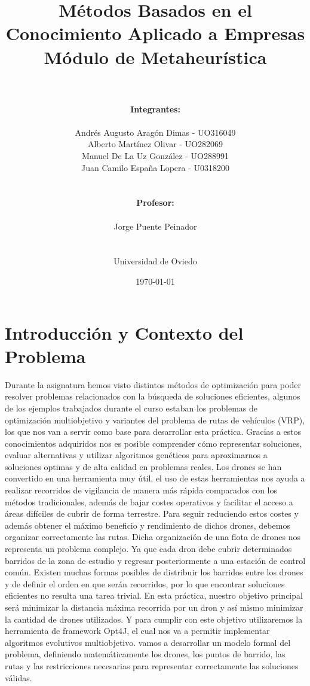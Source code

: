 \documentclass[11pt,a4paper]{article}
\title{Métodos Basados en el Conocimiento Aplicado a Empresas\\
       Módulo de Metaheurística}
\author{\\\\
\textbf{Integrantes:}\\\\
Andrés Augusto Aragón Dimas - UO316049 \\
Alberto Martínez Olivar - UO282069\\ 
Manuel De La Uz González - UO288991\\ 
Juan Camilo España Lopera - U0318200\\\\\\
\textbf{Profesor:}\\\\
Jorge Puente Peinador\\\\\\
Universidad de Oviedo\\
}
\date{\today}
\begin{document}
\maketitle

\newpage
\tableofcontents

\newpage
\section{Introducción y Contexto del Problema}


Durante la asignatura hemos visto distintos métodos de optimización para poder resolver problemas relacionados con la búsqueda de soluciones eficientes, algunos de los ejemplos trabajados durante el curso estaban los problemas de optimización multiobjetivo y variantes del problema de rutas de vehículos (VRP), los que nos van a servir como base para desarrollar esta práctica. Gracias a estos conocimientos adquiridos nos es posible comprender cómo representar soluciones, evaluar alternativas y utilizar algoritmos genéticos para aproximarnos a soluciones optimas y de alta calidad en problemas reales.
Los drones se han convertido en una herramienta muy útil, el uso de estas herramientas nos ayuda a realizar recorridos de vigilancia de manera más rápida comparados con los métodos tradicionales, además de bajar costes operativos y facilitar el acceso a áreas difíciles de cubrir de forma terrestre. Para seguir reduciendo estos costes y además obtener el máximo beneficio y rendimiento de dichos drones, debemos organizar correctamente las rutas.
Dicha organización de una flota de drones nos representa un problema complejo. Ya que cada dron debe cubrir determinados barridos de la zona de estudio y regresar posteriormente a una estación de control común. Existen muchas formas posibles de distribuir los barridos entre los drones y de definir el orden en que serán recorridos, por lo que encontrar soluciones eficientes no resulta una tarea trivial.
En esta práctica, nuestro objetivo principal será minimizar la distancia máxima recorrida por un dron y así mismo minimizar la cantidad de drones utilizados. Y para cumplir con este objetivo utilizaremos la herramienta de framework Opt4J, el cual nos va a permitir implementar algoritmos evolutivos multiobjetivo. vamos a desarrollar un modelo formal del problema, definiendo matemáticamente los drones, los puntos de barrido, las rutas y las restricciones necesarias para representar correctamente las soluciones válidas.
\end{document}
